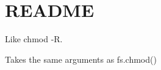 \chapter{README}
\hypertarget{md__c_1_2_users_2_s_t_r_i_d_e_r_2source_2repos_2_internal_a_p_i_2_internal_a_p_i_2wwwroot_2lib_20b19b5da12f187914ee65e2651cc0f0a}{}\label{md__c_1_2_users_2_s_t_r_i_d_e_r_2source_2repos_2_internal_a_p_i_2_internal_a_p_i_2wwwroot_2lib_20b19b5da12f187914ee65e2651cc0f0a}
Like {\ttfamily chmod -\/R}.

Takes the same arguments as {\ttfamily fs.\+chmod()} 